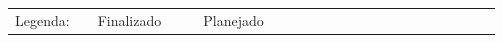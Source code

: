 \begin{table}[!ht]
{\begin{tabular}{l|l|llll|l|lllllllllllllllllll}
Legenda:                                                                                                                                  & \cellcolor[HTML]{008000}                        & \multicolumn{3}{l}{Finalizado}                                                                                                                      &                                                 & \cellcolor[HTML]{F8FF00}                        & \multicolumn{3}{l}{Planejado}                                                                                                                       &                                                 &                                                 &                                                 &                                                 &                                                 &                                                 &                                                 &                                                 &                                                 &                                                 &                                                 &                                                 &                                                 &                                                 &                                                 &                                                 \\ \cline{2-2} \cline{7-7}
\end{tabular}
}
\end{table}